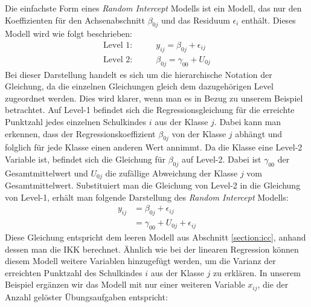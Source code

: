 \documentclass[12pt, a4paper]{article}\usepackage[]{graphicx}\usepackage[]{color}
\begin{document}
Die einfachste Form eines \textit{Random Intercept} Modells ist ein Modell, das nur den Koeffizienten für den Achsenabschnitt $\beta_{0j}$ und das Residuum $\epsilon_i$ enthält. Dieses Modell wird wie folgt beschrieben:
\begin{equation}
\begin{split}	
\text{Level 1:} & \qquad y_{ij} 	= \beta_{0j} + \epsilon_{ij}\\
\text{Level 2:} & \qquad \beta_{0j} = \gamma_{00} + U_{0j}
\end{split}	
\end{equation} 
Bei dieser Darstellung handelt es sich um die hierarchische Notation der Gleichung, da die einzelnen Gleichungen gleich dem dazugehörigen Level zugeordnet werden. Dies wird klarer, wenn man es in Bezug zu unserem Beispiel betrachtet. Auf Level-1 befindet sich die Regressionsgleichung für die erreichte Punktzahl jedes einzelnen Schulkindes $i$ aus der Klasse $j$. Dabei kann man erkennen, dass der Regressionskoeffizient $\beta_{0j}$ von der Klasse $j$ abhängt und folglich für jede Klasse einen anderen Wert annimmt. Da die Klasse eine Level-2 Variable ist, befindet sich die Gleichung für $\beta_{0j}$ auf Level-2. Dabei ist $\gamma_{00}$ der Gesamtmittelwert und $U_{0j}$ die zufällige Abweichung der Klasse $j$ vom Gesamtmittelwert. Substituiert man die Gleichung von Level-2 in die Gleichung von Level-1, erhält man folgende Darstellung des \textit{Random Intercept} Modells:
\begin{equation}
\begin{split}
y_{ij} 	& = \beta_{0j} + \epsilon_{ij}\\
		& = \gamma_{00} + U_{0j} + \epsilon_{ij}
\end{split}
\end{equation}
Diese Gleichung entspricht dem leeren Modell aus Abschnitt \ref{section:icc}, anhand dessen man die IKK berechnet. Ähnlich wie bei der linearen Regression können diesem Modell weitere Variablen hinzugefügt werden, um die Varianz der erreichten Punktzahl des Schulkindes $i$ aus der Klasse $j$ zu erklären. In unserem Beispiel ergänzen wir das Modell mit nur einer weiteren Variable $x_{ij}$, die der Anzahl gelöster Übungsaufgaben entspricht:
\end{document}
